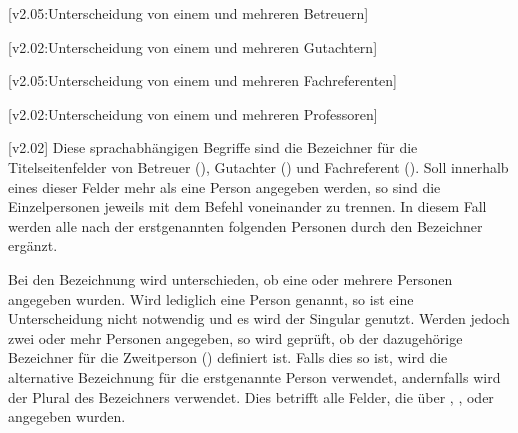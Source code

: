 \begin{DeclareEntity*}{}
\begin{DeclareEntity*}{}
\begin{DeclareEntity*}{}
\begin{Declaration}
  {}
  [v2.05:Unterscheidung von einem und mehreren Betreuern]
\begin{Declaration}
  {}
\begin{Declaration}
  {}
  [v2.02:Unterscheidung von einem und mehreren Gutachtern]
\begin{Declaration}
  {}
\begin{Declaration}
  {}
  [v2.05:Unterscheidung von einem und mehreren Fachreferenten]
\begin{Declaration}
  {}
\begin{Declaration}
  {}
  [v2.02:Unterscheidung von einem und mehreren Professoren]
\begin{Declaration}
  {}
  [v2.02]
Diese sprachabhängigen Begriffe sind die Bezeichner für die Titelseitenfelder 
von Betreuer (), Gutachter () und Fachreferent 
(). Soll innerhalb eines dieser Felder mehr als eine Person 
angegeben werden, so sind die Einzelpersonen jeweils mit dem Befehl  
voneinander zu trennen. In diesem Fall werden alle nach der erstgenannten 
folgenden Personen durch den Bezeichner  ergänzt.

%
Bei den Bezeichnung wird unterschieden, ob eine oder mehrere Personen angegeben 
wurden. Wird lediglich eine Person genannt, so ist eine Unterscheidung nicht 
notwendig und es wird der Singular genutzt. Werden jedoch zwei oder mehr 
Personen angegeben, so wird geprüft, ob der dazugehörige Bezeichner für die 
Zweitperson () definiert ist. Falls dies so ist, wird 
die alternative Bezeichnung für die erstgenannte Person verwendet, andernfalls 
wird der Plural des Bezeichners verwendet. Dies betrifft alle Felder, die über 
, ,  oder  
angegeben wurden.


\end{Declaration}
\end{Declaration}
\end{Declaration}
\end{Declaration}
\end{Declaration}
\end{Declaration}
\end{Declaration}
\end{Declaration}
\end{DeclareEntity*}
\end{DeclareEntity*}
\end{DeclareEntity*}
